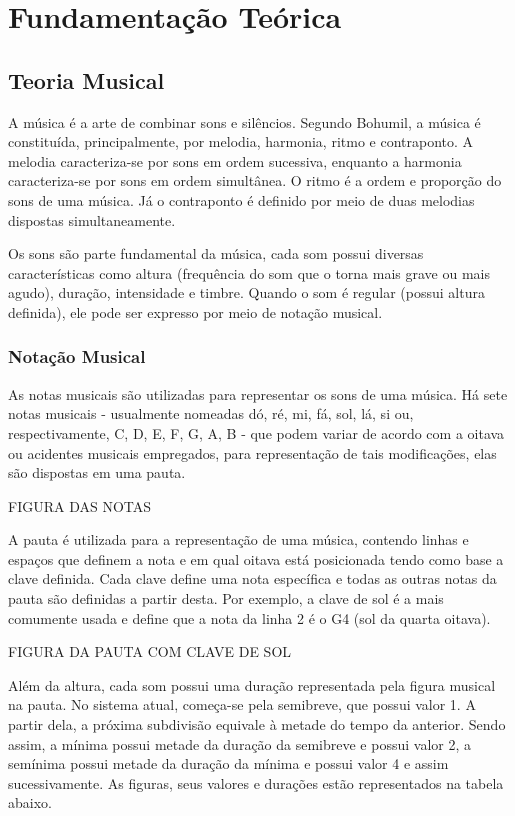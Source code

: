 \chapter[Fundamentação Teórica]{Fundamentação Teórica}

  \section[Teoria Musical]{Teoria Musical}

    A música é a arte de combinar sons e silêncios. Segundo Bohumil, a música é constituída, principalmente, por melodia, harmonia, ritmo e contraponto. A melodia caracteriza-se por sons em ordem sucessiva, enquanto a harmonia caracteriza-se por sons em ordem simultânea. O ritmo é a ordem e proporção do sons de uma música. Já o contraponto é definido por meio de duas melodias dispostas simultaneamente.

    Os sons são parte fundamental da música, cada som possui diversas características como altura (frequência do som que o torna mais grave ou mais agudo), duração, intensidade e timbre. Quando o som é regular (possui altura definida), ele pode ser expresso por meio de notação musical.

    \subsection[Notação Musical]{Notação Musical}

      As notas musicais são utilizadas para representar os sons de uma música. Há sete notas musicais - usualmente nomeadas dó, ré, mi, fá, sol, lá, si ou, respectivamente, C, D, E, F, G, A, B - que podem variar de acordo com a oitava ou acidentes musicais empregados, para representação de tais modificações, elas são dispostas em uma pauta.

      FIGURA DAS NOTAS

      A pauta é utilizada para a representação de uma música, contendo linhas e espaços que definem a nota e em qual oitava está posicionada tendo como base a clave definida. Cada clave define uma nota específica e todas as outras notas da pauta são definidas a partir desta. Por exemplo, a clave de sol é a mais comumente usada e define que a nota da linha 2 é o G4 (sol da quarta oitava).

      FIGURA DA PAUTA COM CLAVE DE SOL

      Além da altura, cada som possui uma duração representada pela figura musical na pauta. No sistema atual, começa-se pela semibreve, que possui valor 1. A partir dela, a próxima subdivisão equivale à metade do tempo da anterior. Sendo assim, a mínima possui metade da duração da semibreve e possui valor 2, a semínima possui metade da duração da mínima e possui valor 4 e assim sucessivamente. As figuras, seus valores e durações estão representados na tabela abaixo.

